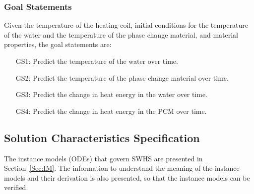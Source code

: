 \documentclass[12pt]{article}
\begin{document}
\subsubsection{Goal Statements}
\label{Sec:GS}
Given the temperature of the heating coil, initial conditions for the temperature of the water and the temperature of the phase change material, and material properties, the goal statements are:
\begin{itemize}
\item[GS1:]Predict the temperature of the water over time.
\item[GS2:]Predict the temperature of the phase change material over time.
\item[GS3:]Predict the change in heat energy in the water over time.
\item[GS4:]Predict the change in heat energy in the PCM over time.
\end{itemize}
\subsection{Solution Characteristics Specification}
\label{Sec:SCS}
The instance models (ODEs) that govern SWHS are presented in Section~\ref{Sec:IM}. The information to understand the meaning of the instance models and their derivation is also presented, so that the instance models can be verified.
\end{document}
